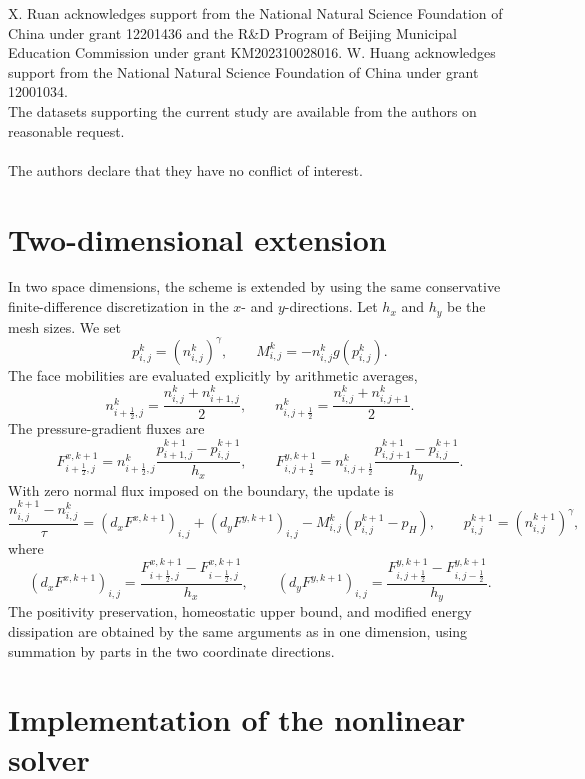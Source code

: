 \documentclass[11pt]{article}
\theoremstyle{plain}
\numberwithin{equation}{section}
\begin{document}
\bigskip
{} X. Ruan acknowledges support  from the National Natural Science Foundation of China under grant  12201436 and the R\&D Program of Beijing Municipal Education Commission under grant KM202310028016.
W. Huang acknowledges support  from the National Natural Science Foundation of China under grant  12001034. 
\\

  The datasets supporting the current study are available from the authors on reasonable request.
\\

\\

  The authors declare that they have no conflict of interest.


\appendix

\section{Two-dimensional extension}
\label{app:2d-extension}

In two space dimensions, the scheme is extended by using the same
conservative finite-difference discretization in the \(x\)- and
\(y\)-directions. Let \(h_x\) and \(h_y\) be the mesh sizes. We set
\[
p_{i,j}^k=(n_{i,j}^k)^\gamma,
\qquad
M_{i,j}^k=-n_{i,j}^k g(p_{i,j}^k).
\]
The face mobilities are evaluated explicitly by arithmetic averages,
\[
n_{i+\frac12,j}^k
=
\frac{n_{i,j}^k+n_{i+1,j}^k}{2},
\qquad
n_{i,j+\frac12}^k
=
\frac{n_{i,j}^k+n_{i,j+1}^k}{2}.
\]
The pressure-gradient fluxes are
\[
F_{i+\frac12,j}^{x,k+1}
=
n_{i+\frac12,j}^k
\frac{p_{i+1,j}^{k+1}-p_{i,j}^{k+1}}{h_x},
\qquad
F_{i,j+\frac12}^{y,k+1}
=
n_{i,j+\frac12}^k
\frac{p_{i,j+1}^{k+1}-p_{i,j}^{k+1}}{h_y}.
\]
With zero normal flux imposed on the boundary, the update is
\[
\frac{n_{i,j}^{k+1}-n_{i,j}^k}{\tau}
=
(d_xF^{x,k+1})_{i,j}
+
(d_yF^{y,k+1})_{i,j}
-
M_{i,j}^k
\left(p_{i,j}^{k+1}-p_H\right),
\qquad
p_{i,j}^{k+1}=(n_{i,j}^{k+1})^\gamma ,
\]
where
\[
(d_xF^{x,k+1})_{i,j}
=
\frac{F^{x,k+1}_{i+\frac12,j}-F^{x,k+1}_{i-\frac12,j}}{h_x},
\qquad
(d_yF^{y,k+1})_{i,j}
=
\frac{F^{y,k+1}_{i,j+\frac12}-F^{y,k+1}_{i,j-\frac12}}{h_y}.
\]
The positivity preservation, homeostatic upper bound, and modified energy
dissipation are obtained by the same arguments as in one dimension, using
summation by parts in the two coordinate directions.

\section{Implementation of the nonlinear solver}
\label{app:nonlinear-solver}
\end{document}
